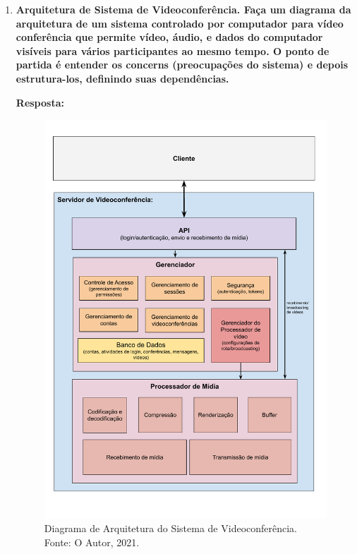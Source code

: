 \documentclass[12pt, a4paper]{article}
\newcommand{\tb}[1]{\textbf{#1}}
\newcommand{\question}[1]{\item \tb{#1}}
\newcommand{\answer}[1]{\par \tb{Resposta:} #1}
\begin{document}
\begin{enumerate}[label=\textbf{\arabic*.}]
        \question{Arquitetura de Sistema de Videoconferência. Faça um diagrama da arquitetura de um sistema controlado por computador para vídeo conferência que permite vídeo, áudio, e dados do computador visíveis para vários participantes ao mesmo tempo. O ponto de partida é entender os concerns (preocupações do sistema) e depois estrutura-los, definindo suas dependências.}
        \answer{
           \begin{figure}[!ht]
               \centering
               \includegraphics[height=0.8\textheight]{q2.pdf}
                \caption{Diagrama de Arquitetura do Sistema de Videoconferência. Fonte: O Autor, 2021.}
               \label{fig:question2}
           \end{figure}
        } \newpage
        

\end{enumerate}
\end{document}
